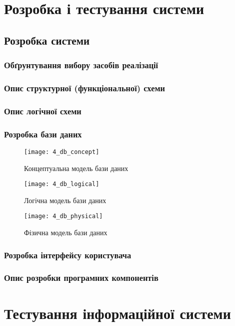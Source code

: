 \documentclass[../main.tex]{subfiles}
\begin{document}
\chapter{Розробка і тестування системи}

\section{Розробка системи}

\subsection{Обґрунтування вибору засобів реалізації}

\subsection{Опис структурної (функціональної) схеми}

\subsection{Опис логічної схеми}

\subsection{Розробка бази даних}

\begin{figure}[H]
	\centering
	\texttt{[image: 4\_db\_concept]}
	\caption{Концептуальна модель бази даних}
\end{figure}

\begin{figure}[H]
	\centering
	\texttt{[image: 4\_db\_logical]}
	\caption{Логічна модель бази даних}
\end{figure}

\begin{figure}[H]
	\centering
	\texttt{[image: 4\_db\_physical]}
	\caption{Фізична модель бази даних}
\end{figure}

\subsection{Розробка інтерфейсу користувача}

\subsection{Опис розробки програмних компонентів}

\chapter{Тестування інформаційної системи}
\end{document}
